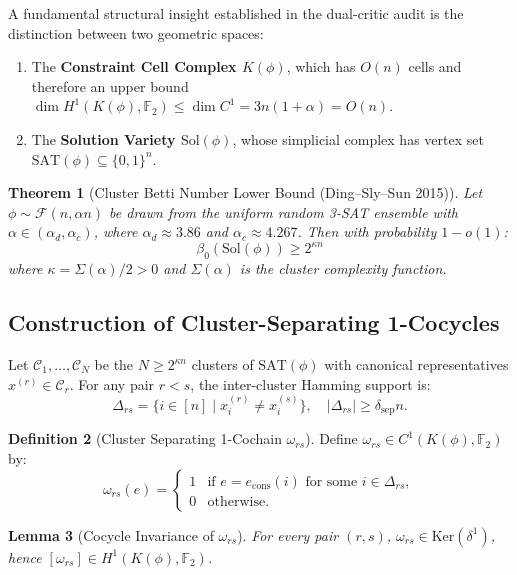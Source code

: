 \documentclass[11pt,a4paper]{article}
\theoremstyle{plain}
\newtheorem{theorem}{Theorem}[section]
\newtheorem{lemma}[theorem]{Lemma}
\theoremstyle{definition}
\newtheorem{definition}[theorem]{Definition}
\theoremstyle{remark}
\newcommand{\Ker}{\mathrm{Ker}}
\begin{document}
A fundamental structural insight established in the dual-critic audit is the distinction between two geometric spaces:
\begin{enumerate}
    \item The \textbf{Constraint Cell Complex $K(\phi)$}, which has $O(n)$ cells and therefore an upper bound $\dim H^1(K(\phi), \mathbb{F}_2) \le \dim C^1 = 3n(1+\alpha) = O(n)$.
    \item The \textbf{Solution Variety $\mathrm{Sol}(\phi)$}, whose simplicial complex has vertex set $\mathrm{SAT}(\phi) \subseteq \{0,1\}^n$.
\end{enumerate}

\begin{theorem}[Cluster Betti Number Lower Bound (Ding--Sly--Sun 2015)]\label{thm:dss_clusters}
Let $\phi \sim \mathcal{F}(n, \alpha n)$ be drawn from the uniform random 3-SAT ensemble with $\alpha \in (\alpha_d, \alpha_c)$, where $\alpha_d \approx 3.86$ and $\alpha_c \approx 4.267$. Then with probability $1 - o(1)$:
\[
\beta_0(\mathrm{Sol}(\phi)) \ge 2^{\kappa n}
\]
where $\kappa = \Sigma(\alpha)/2 > 0$ and $\Sigma(\alpha)$ is the cluster complexity function.
\end{theorem}

\subsection{Construction of Cluster-Separating 1-Cocycles}

Let $\mathcal{C}_1, \dots, \mathcal{C}_N$ be the $N \ge 2^{\kappa n}$ clusters of $\mathrm{SAT}(\phi)$ with canonical representatives $x^{(r)} \in \mathcal{C}_r$. For any pair $r < s$, the inter-cluster Hamming support is:
\[
\Delta_{rs} = \{i \in [n] \mid x^{(r)}_i \ne x^{(s)}_i\}, \quad |\Delta_{rs}| \ge \delta_{\mathrm{sep}} n.
\]

\begin{definition}[Cluster Separating 1-Cochain $\omega_{rs}$]
Define $\omega_{rs} \in C^1(K(\phi), \mathbb{F}_2)$ by:
\[
\omega_{rs}(e) = \begin{cases}
1 & \text{if } e = e_{\mathrm{cons}}(i) \text{ for some } i \in \Delta_{rs}, \\
0 & \text{otherwise}.
\end{cases}
\]
\end{definition}

\begin{lemma}[Cocycle Invariance of $\omega_{rs}$]
For every pair $(r, s)$, $\omega_{rs} \in \Ker(\delta^1)$, hence $[\omega_{rs}] \in H^1(K(\phi), \mathbb{F}_2)$.
\end{lemma}
\end{document}
